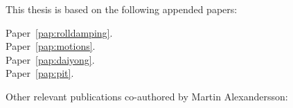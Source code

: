 
\begin{refsection}

This thesis is based on the following appended papers:

\begin{description}
\item[Paper~\ref{pap:rolldamping}.]

\item[Paper~\ref{pap:motions}.] 

\item[Paper~\ref{pap:daiyong}.] 

\item[Paper~\ref{pap:pit}.] 

\end{description}

\vspace{1cm}

\noindent Other relevant publications co-authored by Martin Alexandersson:
\begin{description}
\normalsize
\newcommand{\ME}{{\bfseries Martin Alexandersson}}

\item
{}

\item
{}

\end{description}

\end{refsection}
